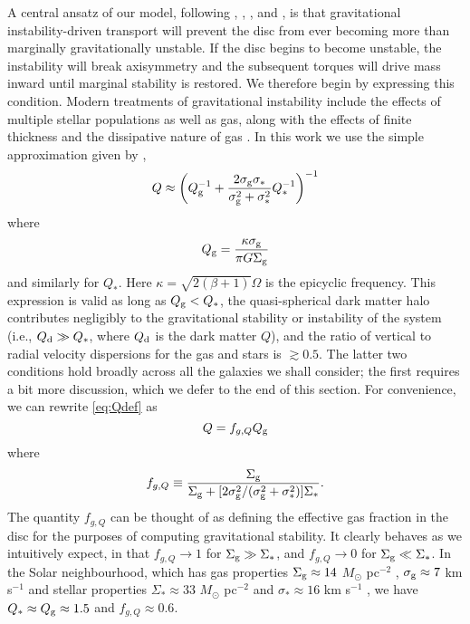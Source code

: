 \documentclass[useAMS,usenatbib]{mn2e}
\begin{document}
A central ansatz of our model, following \citet{krumholz10c}, \citet{cacciato12a}, \citet{forbes12a}, and \citet{forbes14a}, is that gravitational instability-driven transport will prevent the disc from ever becoming more than marginally gravitationally unstable. If the disc begins to become unstable, the instability will break axisymmetry and the subsequent torques will drive mass inward until marginal stability is restored. We therefore begin by expressing this condition. Modern treatments of gravitational instability include the effects of multiple stellar populations as well as gas, along with the effects of finite thickness and the dissipative nature of gas \citep{rafikov01a, romeo10a, romeo11a, elmegreen11a, hoffmann12a, romeo13a}. In this work we use the simple approximation given by \citet{romeo13a}, 
\begin{equation}
\label{eq:Qdef}
Q \approx \left(Q_{\rm g}^{-1} + \frac{2\sigma_{\rm g}\sigma_*}{\sigma_{\rm g}^2+\sigma_*^2} Q_*^{-1}\right)^{-1}
\end{equation}
where
\begin{equation}
\label{eq:Qgas}
Q_{\rm g} = \frac{\kappa\sigma_{\rm g}}{\pi G \Sigma_{\rm g}}
\end{equation}
and similarly for $Q_*$. Here $\kappa = \sqrt{2(\beta+1)}\Omega$ is the epicyclic frequency. This expression is valid as long as $Q_{\rm g} < Q_*$, the quasi-spherical dark matter halo contributes negligibly to the gravitational stability or instability of the system (i.e., $Q_{\rm d} \gg Q_*$, where $Q_{\rm d}$ is the dark matter $Q$), and the ratio of vertical to radial velocity dispersions for the gas and stars is $\gtrsim 0.5$. The latter two conditions hold broadly across all the galaxies we shall consider; the first requires a bit more discussion, which we defer to the end of this section. For convenience, we can rewrite \autoref{eq:Qdef} as
\begin{equation}
\label{eq:Q}
Q = f_{g,Q} Q_{\rm g} 
\end{equation}
where
\begin{equation}
\label{eq:fgQ}
f_{g,Q} \equiv \frac{\Sigma_{\rm g}}{\Sigma_{\rm g} + [2\sigma_{\rm g}^2/(\sigma_{\rm g}^2+\sigma_*^2)] \Sigma_*}.
\end{equation}
The quantity $f_{g,Q}$ can be thought of as defining the effective gas fraction in the disc for the purposes of computing gravitational stability. It clearly behaves as we intuitively expect, in that $f_{g,Q} \rightarrow 1$ for $\Sigma_{\rm g} \gg \Sigma_*$, and $f_{g,Q} \rightarrow 0$ for $\Sigma_{\rm g} \ll \Sigma_*$. In the Solar neighbourhood, which has gas properties $\Sigma_{\rm g} \approx 14$ $M_\odot$ pc$^{-2}$ \citet{mckee15a}, $\sigma_{\rm g} \approx 7$ km s$^{-1}$ \citep{kalberla09a} and stellar properties $\Sigma_* \approx 33$ $M_\odot$ pc$^{-2}$ and $\sigma_* \approx 16$ km s$^{-1}$ \citep{mckee15a}, we have $Q_* \approx Q_{\rm g} \approx 1.5$ and $f_{g,Q} \approx 0.6$.
\end{document}
